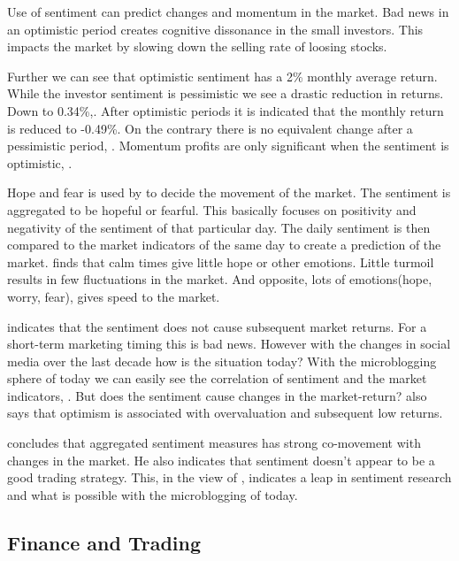 Use of sentiment can predict changes and momentum in the market.
Bad news in an optimistic period creates cognitive dissonance in the small
investors. This impacts the market by slowing down the selling rate of loosing
stocks. \cite[p29]{doukas10:sentiment_and_momentum}

Further we can see that optimistic sentiment has a 2\% monthly average return.
While the investor sentiment is pessimistic we see a drastic reduction in
returns. Down to 0.34\%,\cite[p5]{doukas10:sentiment_and_momentum}.
After optimistic periods it is indicated that the monthly return is reduced to
-0.49\%. On the contrary there is no equivalent change after a pessimistic
period, \cite[p6-7]{doukas10:sentiment_and_momentum}.
Momentum profits are only significant when the sentiment is optimistic,
\cite[p29]{doukas10:sentiment_and_momentum}.

Hope and fear is used by \cite[]{Zhang201155} to decide the movement of the
market. The sentiment is aggregated to be hopeful or fearful. This basically
focuses on positivity and negativity of the sentiment of that particular day.
The daily sentiment is then compared to the market indicators of the same day
to create a prediction of the market. \cite[]{Zhang201155} finds that calm
times give little hope or other emotions. Little turmoil results in few
fluctuations in the market. And opposite, lots of emotions(hope, worry, fear),
gives speed to the market.

\cite[p3]{Brown20041} indicates that the sentiment does not cause subsequent
market returns. For a short-term marketing timing this is bad news. However
with the changes in social media over the last decade how is the situation
today? With the microblogging sphere of today we can easily see the
correlation of sentiment and the market indicators,
\cite[]{annikajubbega11:twitter_driver_stock_price}. But
does the sentiment cause changes in the market-return?
\cite[p3]{Brown20041} also says that optimism is associated with overvaluation
and subsequent low returns.

\cite[p]{Brown20041} concludes that aggregated sentiment measures has strong
co-movement with changes in the market. He also indicates that sentiment
doesn't appear to be a good trading strategy. This, in the view of
\cite[]{Zhang201155}, indicates a leap in sentiment research and what is possible
with the microblogging of today.

\subsection{Finance and Trading}

